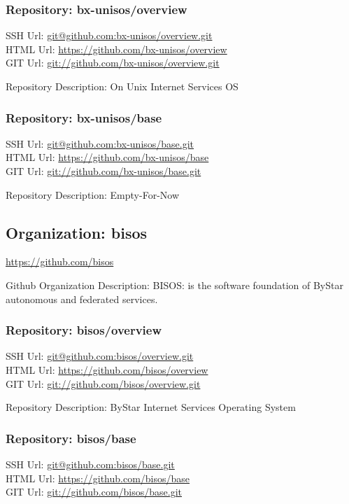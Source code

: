 \subsubsection{Repository: bx-unisos/overview}

SSH Url:  \url{git@github.com:bx-unisos/overview.git}\\
HTML Url: \url{https://github.com/bx-unisos/overview}\\
GIT Url:  \url{git://github.com/bx-unisos/overview.git}

Repository Description: On Unix Internet Services OS

\subsubsection{Repository: bx-unisos/base}

SSH Url:  \url{git@github.com:bx-unisos/base.git}\\
HTML Url: \url{https://github.com/bx-unisos/base}\\
GIT Url:  \url{git://github.com/bx-unisos/base.git}

Repository Description: Empty-For-Now

\subsection{Organization: bisos}

\url{https://github.com/bisos}

Github Organization Description: BISOS: is the software foundation of ByStar autonomous and federated services.

\subsubsection{Repository: bisos/overview}

SSH Url:  \url{git@github.com:bisos/overview.git}\\
HTML Url: \url{https://github.com/bisos/overview}\\
GIT Url:  \url{git://github.com/bisos/overview.git}

Repository Description: ByStar Internet Services Operating System

\subsubsection{Repository: bisos/base}

SSH Url:  \url{git@github.com:bisos/base.git}\\
HTML Url: \url{https://github.com/bisos/base}\\
GIT Url:  \url{git://github.com/bisos/base.git}


